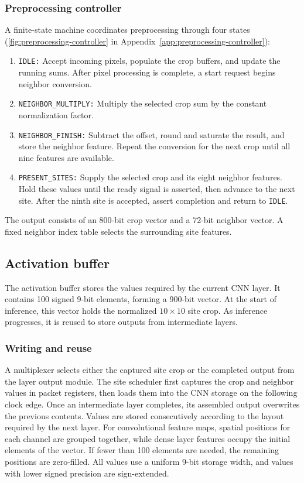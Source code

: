 \subsubsection{Preprocessing controller}
A finite-state machine coordinates preprocessing through four states (\cref{fig:preprocessing-controller} in Appendix~\ref{app:preprocessing-controller}):
\begin{enumerate}
    \item \texttt{IDLE:} Accept incoming pixels, populate the crop buffers, and update the running sums. After pixel processing is complete, a start request begins neighbor conversion.
    \item \texttt{NEIGHBOR\_MULTIPLY:} Multiply the selected crop sum by the constant normalization factor.
    \item \texttt{NEIGHBOR\_FINISH:} Subtract the offset, round and saturate the result, and store the neighbor feature. Repeat the conversion for the next crop until all nine features are available.
    \item \texttt{PRESENT\_SITES:} Supply the selected crop and its eight neighbor features. Hold these values until the ready signal is asserted, then advance to the next site. After the ninth site is accepted, assert completion and return to \texttt{IDLE}.
\end{enumerate}


The output consists of an 800-bit crop vector and a 72-bit neighbor vector. A fixed neighbor index table selects the surrounding site features.

\subsection{Activation buffer}
The activation buffer stores the values required by the current CNN layer. It contains 100 signed 9-bit elements, forming a 900-bit vector. At the start of inference, this vector holds the normalized $10\times10$ site crop. As inference progresses, it is reused to store outputs from intermediate layers.
\subsubsection{Writing and reuse}
A multiplexer selects either the captured site crop or the completed output from the layer output module. The site scheduler first captures the crop and neighbor values in packet registers, then loads them into the CNN storage on the following clock edge.
Once an intermediate layer completes, its assembled output overwrites the previous contents. Values are stored consecutively according to the layout required by the next layer. For convolutional feature maps, spatial positions for each channel are grouped together, while dense layer features occupy the initial elements of the vector. If fewer than 100 elements are needed, the remaining positions are zero-filled. All values use a uniform 9-bit storage width, and values with lower signed precision are sign-extended.
